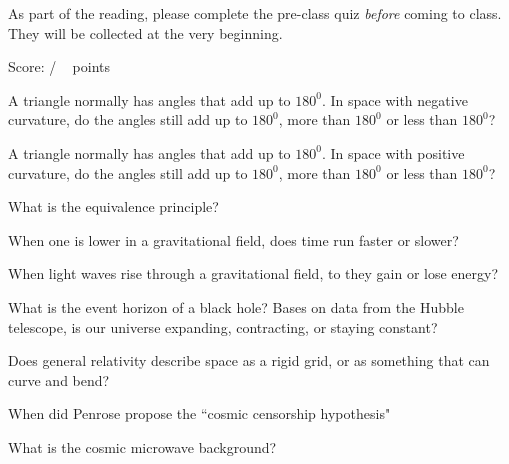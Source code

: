 \documentclass[addpoints,12pt]{exam}
\begin{document}
As part of the reading, please complete the pre-class quiz \textit{before} coming to class. They will be collected at the very beginning.
 
\clearpage

\begin{flushright}
Score: \hspace{0.2in} / \numpoints ~ points
\end{flushright}


\begin{questions}

\question[1]
A triangle normally has angles that add up to $180^0$. In space with negative curvature, do the angles still add up to $180^0$, more than $180^0$ or less than $180^0$?
\fillwithlines{0.5in}

\question[1]
A triangle normally has angles that add up to $180^0$. In space with positive curvature, do the angles still add up to $180^0$, more than $180^0$ or less than $180^0$?
\fillwithlines{0.5in}

\question[1]
What is the equivalence principle?
\fillwithlines{0.5in}

\question[1]
When one is lower in a gravitational field, does time run faster or slower?
\fillwithlines{0.5in}

\question[1]
When light waves rise through a gravitational field, to they gain or lose energy?
\fillwithlines{0.5in}

\question[1]
What is the event horizon of a black hole?
\fillwithlines{0.5in}
\question[1]
Bases on data from the Hubble telescope, is our universe expanding, contracting, or staying constant?
\fillwithlines{0.5in}

\question[1]
Does general relativity describe space as a rigid grid, or as something that can curve and bend?
\fillwithlines{0.5in}

\question[1]
When did Penrose propose the ``cosmic censorship hypothesis"
\fillwithlines{0.5in}

\question[1]
What is the cosmic microwave background?
\fillwithlines{0.5in}

\end{questions}
\end{document}
